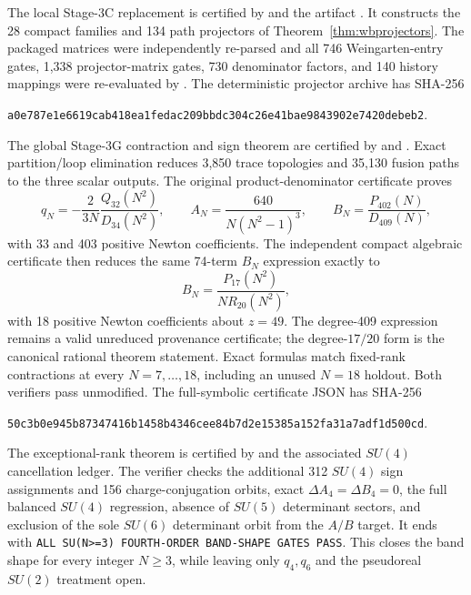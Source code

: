 \documentclass[11pt]{article}
\begin{document}
The local Stage-3C replacement is certified by
 and the artifact
. It constructs the
28 compact families and 134 path projectors of
Theorem~\ref{thm:wbprojectors}. The packaged matrices were independently
re-parsed and all 746 Weingarten-entry gates, 1,338 projector-matrix gates,
730 denominator factors, and 140 history mappings were re-evaluated by
. The deterministic projector archive
has SHA-256
\begin{center}
\texttt{a0e787e1e6619cab418ea1fedac209bbdc304c26e41bae9843902e7420debeb2}.
\end{center}
The global Stage-3G contraction and sign theorem are certified by
 and
. Exact partition/loop elimination reduces
3,850 trace topologies and 35,130 fusion paths to the three scalar outputs.
The original product-denominator certificate proves
\[
q_N=-\frac{2}{3N}\frac{Q_{32}(N^2)}{D_{34}(N^2)},\qquad
A_N=\frac{640}{N(N^2-1)^3},\qquad
B_N=\frac{P_{402}(N)}{D_{409}(N)},
\]
with 33 and 403 positive Newton coefficients. The independent compact
algebraic certificate then reduces the same 74-term $B_N$ expression exactly
to
\[
B_N=\frac{P_{17}(N^2)}{N R_{20}(N^2)},
\]
with 18 positive Newton coefficients about $z=49$. The degree-409 expression
remains a valid unreduced provenance certificate; the degree-$17/20$ form is
the canonical rational theorem statement. Exact formulas match fixed-rank
contractions at every $N=7,\ldots,18$, including an unused $N=18$ holdout.
Both verifiers pass unmodified. The full-symbolic certificate JSON has
SHA-256
\begin{center}
\texttt{50c3b0e945b87347416b1458b4346cee84b7d2e15385a152fa31a7adf1d500cd}.
\end{center}

The exceptional-rank theorem is certified by
 and the associated $SU(4)$
cancellation ledger. The verifier checks the additional 312 $SU(4)$ sign
assignments and 156 charge-conjugation orbits, exact
$\Delta A_4=\Delta B_4=0$, the full balanced $SU(4)$ regression, absence of
$SU(5)$ determinant sectors, and exclusion of the sole $SU(6)$ determinant
orbit from the $A/B$ target. It ends with
\texttt{ALL SU(N>=3) FOURTH-ORDER BAND-SHAPE GATES PASS}. This closes the
band shape for every integer $N\geq3$, while leaving only $q_4,q_6$ and the
pseudoreal $SU(2)$ treatment open.
\end{document}
